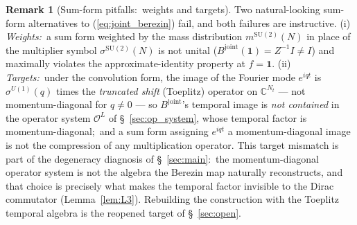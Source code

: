 \documentclass[11pt,a4paper]{article}
\theoremstyle{plain}
\theoremstyle{definition}
\newtheorem{remark}[theorem]{Remark}
\newcommand{\Nt}{N_{t}}
\newcommand{\Op}{\mathcal{O}}
\newcommand{\C}{\mathbb{C}}
\newcommand{\SU}{\mathrm{SU}}
\newcommand{\Uone}{U(1)}
\newcommand{\Bjoint}{B^{\mathrm{joint}}}
\begin{document}
\begin{remark}[Sum-form pitfalls:\ weights and targets]
\label{rem:berezin_inequivalence}
Two natural-looking sum-form alternatives to
(\ref{eq:joint_berezin}) fail, and both failures are instructive.
(i) \emph{Weights:}\ a sum form weighted by the mass distribution
$m^{\SU(2)}(N)$ in place of the multiplier symbol
$\sigma^{\SU(2)}(N)$ is not unital
($\Bjoint(\mathbf{1}) = Z^{-1} I \ne I$) and maximally violates the
approximate-identity property at $f = \mathbf{1}$.
(ii) \emph{Targets:}\ under the convolution form, the image of the
Fourier mode $e^{iqt}$ is $\sigma^{\Uone}(q)$ times the
\emph{truncated shift} (Toeplitz) operator on $\C^{\Nt}$ — not
momentum-diagonal for $q \ne 0$ — so $\Bjoint$'s temporal image is
\emph{not contained} in the operator system $\Op^{L}$ of
\S~\ref{sec:op_system}, whose temporal factor is momentum-diagonal;\
and a sum form assigning $e^{iqt}$ a momentum-diagonal image is not
the compression of any multiplication operator. This target mismatch
is part of the degeneracy diagnosis of \S~\ref{sec:main}:\ the
momentum-diagonal operator system is not the algebra the Berezin map
naturally reconstructs, and that choice is precisely what makes the
temporal factor invisible to the Dirac commutator
(Lemma~\ref{lem:L3}). Rebuilding the construction with the Toeplitz
temporal algebra is the reopened target of \S~\ref{sec:open}.
\end{remark}
\end{document}
